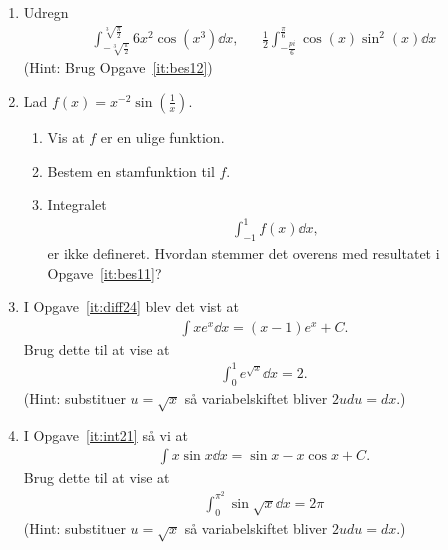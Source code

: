 \begin{enumerate}
	\item Udregn
	\begin{align*}
	\int_{-\sqrt[3]{\frac{\pi}{2}}}^{\sqrt[3]{\frac{\pi}{2}}} 6x^2\cos(x^3) \dd x,&& \frac{1}{2}\int_{-\frac{pi}{6}}^{\frac{\pi}{6}}\cos(x)\sin^2(x) \dd x
	\end{align*}
		(Hint: Brug Opgave~\ref{it:bes12})
	
	\item Lad $f(x)=x^{-2}\sin (\frac{1}{x})$.
	\begin{enumerate}
		\item Vis at $f$ er en ulige funktion.
		\item Bestem en stamfunktion til $f$. 
		\item Integralet 
		\begin{align*}
		\int_{-1}^{1} f(x)\dd x,
		\end{align*}
		er ikke defineret. Hvordan stemmer det overens med resultatet i Opgave~\ref{it:bes11}?
	\end{enumerate} 
	
	\item I Opgave~\ref{it:diff24} blev det vist at
	\begin{align*}
	\int xe^x\dd x=(x-1)e^x+C.
	\end{align*}
	Brug dette til at vise at 
	\begin{align*}
	\int_0^1 e^{\sqrt{x}}\dd x =2.
	\end{align*}
	(Hint: substituer $u=\sqrt{x}$ så variabelskiftet bliver $2u du =dx$.)
	
	\item I Opgave~\ref{it:int21} så vi at 
	\begin{align*}
	\int x\sin x\dd x=\sin x-x\cos x+C.
	\end{align*}
	Brug dette til at vise at 
	\begin{align*}
	\int_0^{\pi^2} \sin\sqrt{x}\dd x =2\pi
	\end{align*}
		(Hint: substituer $u=\sqrt{x}$ så variabelskiftet bliver $2u du =dx$.)
	

\end{enumerate}

